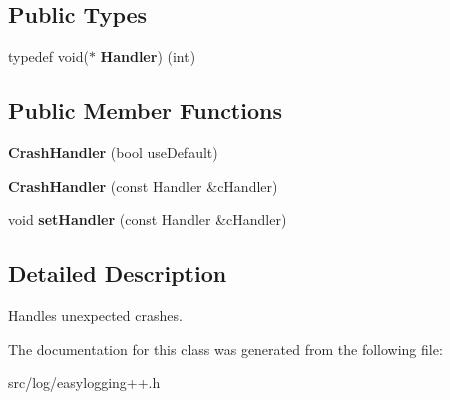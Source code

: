 \subsection*{Public Types}
\begin{DoxyCompactItemize}
\item 
typedef void($\ast$ {\bfseries Handler}) (int)\hypertarget{classel_1_1base_1_1debug_1_1CrashHandler_aebf80d2fd5180d9c56db5a7e9abc7ad9}{}\label{classel_1_1base_1_1debug_1_1CrashHandler_aebf80d2fd5180d9c56db5a7e9abc7ad9}

\end{DoxyCompactItemize}
\subsection*{Public Member Functions}
\begin{DoxyCompactItemize}
\item 
{\bfseries Crash\+Handler} (bool use\+Default)\hypertarget{classel_1_1base_1_1debug_1_1CrashHandler_a1d1e1a77bb6c37b1fbb39ecf94b38983}{}\label{classel_1_1base_1_1debug_1_1CrashHandler_a1d1e1a77bb6c37b1fbb39ecf94b38983}

\item 
{\bfseries Crash\+Handler} (const Handler \&c\+Handler)\hypertarget{classel_1_1base_1_1debug_1_1CrashHandler_a9fbf8df7a292fcbeabfb87b241c83f78}{}\label{classel_1_1base_1_1debug_1_1CrashHandler_a9fbf8df7a292fcbeabfb87b241c83f78}

\item 
void {\bfseries set\+Handler} (const Handler \&c\+Handler)\hypertarget{classel_1_1base_1_1debug_1_1CrashHandler_abd1d3d1ad5f1de2d40c39dd0542c26d4}{}\label{classel_1_1base_1_1debug_1_1CrashHandler_abd1d3d1ad5f1de2d40c39dd0542c26d4}

\end{DoxyCompactItemize}


\subsection{Detailed Description}
Handles unexpected crashes. 

The documentation for this class was generated from the following file\+:\begin{DoxyCompactItemize}
\item 
src/log/easylogging++.\+h\end{DoxyCompactItemize}
